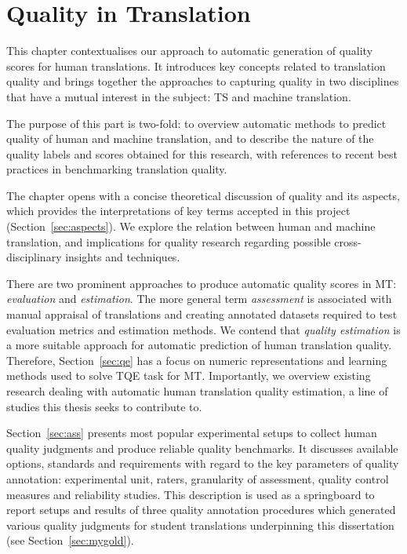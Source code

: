\chapter{\label{cha:quest}Quality in Translation} %
This chapter contextualises our approach to automatic generation of quality scores for human translations. It introduces key concepts related to translation quality and brings together the approaches to capturing quality in two disciplines that have a mutual interest in the subject: \gls{TS} and machine translation.

The purpose of this part is two-fold: to overview automatic methods to predict quality of human and machine translation, and to describe the nature of the quality labels and scores obtained for this research, with references to recent best practices in benchmarking translation quality. 

The chapter opens with a concise theoretical discussion of quality and its aspects, which provides the interpretations of key terms accepted in this project (Section~\ref{sec:aspects}). We explore the relation between human and machine translation, and implications for quality research regarding possible cross-disciplinary insights and techniques.

There are two prominent approaches to produce automatic quality scores in MT: \textit{evaluation} and \textit{estimation}. The more general term \textit{assessment} is associated with manual appraisal of translations and creating annotated datasets required to test evaluation metrics and estimation methods. 
We contend that \textit{quality estimation} is a more suitable approach for automatic prediction of human translation quality. 
Therefore, Section~\ref{sec:qe} has a focus on numeric representations 
and learning methods used to solve \gls{TQE} task for MT. Importantly, we overview existing research dealing with automatic human translation quality estimation, a line of studies this thesis seeks to contribute to. 

Section~\ref{sec:ass} presents most popular experimental setups to collect human quality judgments and produce reliable quality benchmarks. It discusses available options, standards and requirements with regard to the key parameters of quality annotation: experimental unit, raters, granularity of assessment, quality control measures and reliability studies. This description is used as a springboard to report setups and results of three quality annotation procedures which generated various quality judgments for student translations underpinning this dissertation (see Section~\ref{sec:mygold}). 
 
